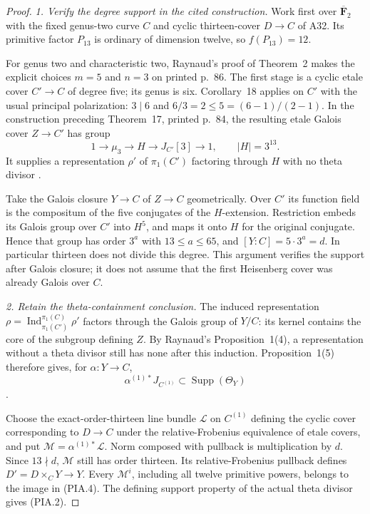 \begin{proof}
\emph{1. Verify the degree support in the cited construction.}
Work first over $\overline{\mathbf F}_2$ with the fixed genus-two
curve $C$ and cyclic thirteen-cover $D\to C$ of A32.
Its primitive factor $P_{13}$ is ordinary of dimension twelve,
so $f(P_{13})=12$.

For genus two and characteristic two, Raynaud's proof of
Theorem~2 makes the explicit choices $m=5$ and $n=3$
on printed p.~86. The first stage is a cyclic etale cover
$C'\to C$ of degree five; its genus is six.
Corollary~18 applies on $C'$ with the usual principal
polarization: $3\mid6$ and $6/3=2\le5=(6-1)/(2-1)$.
In the construction preceding Theorem~17, printed p.~84,
the resulting etale Galois cover $Z\to C'$ has group
\[
 1\longrightarrow\mu_3\longrightarrow H
            \longrightarrow J_{C'}[3]\longrightarrow1,
                         \qquad |H|=3^{13}.
 \tag{PIA.3}
\]
It supplies a representation $\rho'$ of $\pi_1(C')$ factoring
through $H$ with no theta divisor
\cite[pp.~84--86, Theorem~17, Corollary~18 and proof of Theorem~2]{RaynaudNonordinary2000}.

Take the Galois closure $Y\to C$ of $Z\to C$ geometrically.
Over $C'$ its function field is the compositum of the five
conjugates of the $H$-extension. Restriction embeds its Galois
group over $C'$ into $H^5$, and maps it onto $H$ for the
original conjugate. Hence that group has order $3^a$ with
$13\le a\le65$, and $[Y:C]=5\cdot3^a=d$.
In particular thirteen does not divide this degree.
This argument verifies the support after Galois closure;
it does not assume that the first Heisenberg cover was
already Galois over $C$.

\emph{2. Retain the theta-containment conclusion.}
The induced representation
$\rho=\operatorname{Ind}_{\pi_1(C')}^{\pi_1(C)}\rho'$
factors through the Galois group of $Y/C$: its kernel
contains the core of the subgroup defining $Z$.
By Raynaud's Proposition~1(4), a representation without a
theta divisor still has none after this induction.
Proposition~1(5) therefore gives, for $\alpha:Y\to C$,
\[
       \alpha^{(1)*}J_{C^{(1)}}
                         \subset\operatorname{Supp}(\Theta_Y)
 \tag{PIA.4}
\]
\cite[Proposition~1(4)--(5), p.~75]{RaynaudNonordinary2000}.

Choose the exact-order-thirteen line bundle $\mathcal L$
on $C^{(1)}$ defining the cyclic cover corresponding to
$D\to C$ under the relative-Frobenius equivalence of etale
covers, and put $\mathcal M=\alpha^{(1)*}\mathcal L$.
Norm composed with pullback is multiplication by $d$.
Since $13\nmid d$, $\mathcal M$ still has order thirteen.
Its relative-Frobenius pullback defines
$D'=D\times_CY\to Y$. Every $\mathcal M^i$, including all
twelve primitive powers, belongs to the image in (PIA.4).
The defining support property of the actual theta divisor
gives (PIA.2).


\end{proof}
